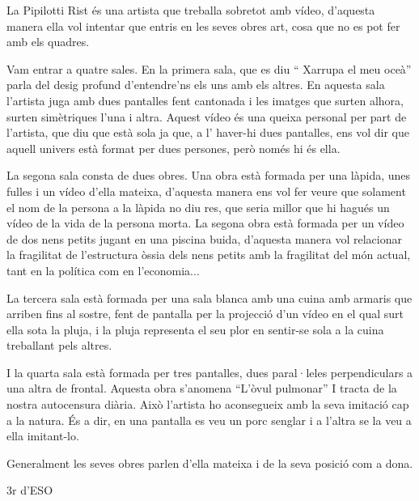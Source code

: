 

La Pipilotti Rist és una artista que treballa sobretot amb vídeo, d’aquesta manera ella vol intentar que entris en les seves obres art, cosa que no es pot fer amb els quadres. 


Vam entrar  a quatre sales. En la primera sala, que es diu “ Xarrupa el meu oceà” parla del desig profund d’entendre’ns els uns amb els altres. En aquesta sala l’artista juga amb dues pantalles fent cantonada i  les imatges que surten alhora, surten simètriques l’una i altra.  Aquest vídeo és una queixa personal per part de l’artista, que diu que està sola  ja que, a l’ haver-hi dues pantalles, ens vol dir que aquell univers està format per dues persones, però només hi és  ella.

La segona sala consta de dues obres. Una obra està formada  per una làpida, unes fulles i un  vídeo d’ella mateixa, d’aquesta manera ens vol fer veure que solament el nom de la persona a la làpida no diu res, que seria millor que hi hagués un vídeo de la vida de la persona morta. La segona obra està formada per un vídeo de dos nens petits jugant en una piscina buida, d’aquesta manera vol relacionar la fragilitat de l’estructura òssia dels nens petits amb la fragilitat del món actual, tant en la política com en l’economia...

La tercera sala està formada per una sala blanca amb una cuina amb armaris que arriben fins al sostre, fent de pantalla per la projecció d’un vídeo en el qual surt ella sota la pluja, i  la pluja representa el seu plor en sentir-se sola a la cuina treballant pels altres.

I la quarta sala està formada per tres pantalles, dues paral·leles perpendiculars a una altra de frontal. Aquesta obra s’anomena “L’òvul pulmonar” I tracta de la nostra autocensura diària. Això l’artista ho aconsegueix amb la seva imitació cap a la natura. És a dir,  en una pantalla es veu un porc senglar i a l’altra se la veu a ella imitant-lo.


Generalment les seves obres parlen d’ella mateixa i de la seva posició com a dona.

{3r d’ESO}


